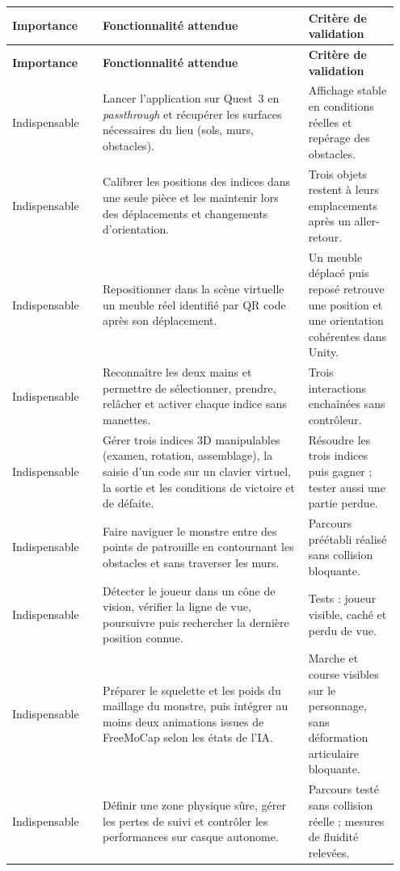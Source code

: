 \documentclass[11pt,a4paper]{article}
\newcommand{\essential}{\textcolor{priorityHigh}{Indispensable}}
\renewcommand{\arraystretch}{1.36}
\begin{document}
{\small
\setlength{\LTpre}{1.1em}
\setlength{\LTpost}{0.9em}
\renewcommand{\arraystretch}{1.42}
\begin{longtable}{@{}L{0.222\linewidth}L{0.50\linewidth}L{0.224\linewidth}@{}}
\toprule
\textbf{Importance} & \textbf{Fonctionnalité attendue} & \textbf{Critère de validation} \\
\midrule
\endfirsthead
\toprule
\textbf{Importance} & \textbf{Fonctionnalité attendue} & \textbf{Critère de validation} \\
\midrule
\endhead
\essential & Lancer l'application sur Quest~3 en \emph{passthrough} et récupérer les surfaces nécessaires du lieu (sols, murs, obstacles). & Affichage stable en conditions réelles et repérage des obstacles. \\
\addlinespace[0.25em]
\essential & Calibrer les positions des indices dans une seule pièce et les maintenir lors des déplacements et changements d'orientation. & Trois objets restent à leurs emplacements après un aller-retour. \\
\addlinespace[0.25em]
\essential & Repositionner dans la scène virtuelle un meuble réel identifié par QR code après son déplacement. & Un meuble déplacé puis reposé retrouve une position et une orientation cohérentes dans Unity. \\
\addlinespace[0.25em]
\essential & Reconnaître les deux mains et permettre de sélectionner, prendre, relâcher et activer chaque indice sans manettes. & Trois interactions enchaînées sans contrôleur. \\
\addlinespace[0.25em]
\essential & Gérer trois indices 3D manipulables (examen, rotation, assemblage), la saisie d'un code sur un clavier virtuel, la sortie et les conditions de victoire et de défaite. & Résoudre les trois indices puis gagner ; tester aussi une partie perdue. \\
\addlinespace[0.25em]
\essential & Faire naviguer le monstre entre des points de patrouille en contournant les obstacles et sans traverser les murs. & Parcours préétabli réalisé sans collision bloquante. \\
\addlinespace[0.25em]
\essential & Détecter le joueur dans un cône de vision, vérifier la ligne de vue, poursuivre puis rechercher la dernière position connue. & Tests : joueur visible, caché et perdu de vue. \\
\addlinespace[0.25em]
\essential & Préparer le squelette et les poids du maillage du monstre, puis intégrer au moins deux animations issues de FreeMoCap selon les états de l'IA. & Marche et course visibles sur le personnage, sans déformation articulaire bloquante. \\
\addlinespace[0.25em]
\essential & Définir une zone physique sûre, gérer les pertes de suivi et contrôler les performances sur casque autonome. & Parcours testé sans collision réelle ; mesures de fluidité relevées. \\
\bottomrule
\end{longtable}
}
\end{document}
